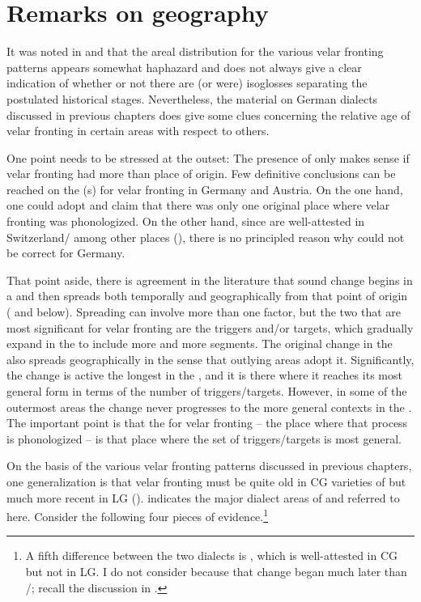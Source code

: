 \section{{Remarks} {on} {geography}}\label{sec:16.4}

It was noted in  and  that the areal distribution for the various velar fronting patterns appears somewhat haphazard and does not always give a clear indication of whether or not there are (or were) isoglosses separating the postulated historical stages. Nevertheless, the material on German dialects discussed in previous chapters does give some clues concerning the relative age of velar fronting in certain areas with respect to others.

One point needs to be stressed at the outset: The presence of  only makes sense if velar fronting had more than place of origin. Few definitive conclusions can be reached on the (s) for velar fronting in Germany and Austria. On the one hand, one could adopt  and claim that there was only one original place where velar fronting was phonologized. On the other hand, since  are well-attested in Switzerland/ among other places (), there is no principled reason why  could not be correct for Germany.

That point aside, there is agreement in the literature that  sound change begins in a  and then spreads both temporally and geographically from that point of origin ( and  below). Spreading can involve more than one factor, but the two that are most significant for velar fronting are the triggers and/or targets, which gradually expand in the  to include more and more segments. The original change in the  also spreads geographically in the sense that outlying areas adopt it. Significantly, the change is active the longest in the , and it is there where it reaches its most general form in terms of the number of triggers/targets. However, in some of the outermost areas the change never progresses to the more general contexts in the . The important point is that the  for velar fronting -- the place where that process is phonologized -- is that place where the set of triggers/targets is most general.\largerpage

On the basis of the various velar fronting patterns discussed in previous chapters, one generalization is that velar fronting must be quite old in CG varieties of  but much more recent in LG ().  indicates the major dialect areas of  and  referred to here. Consider the following four pieces of evidence.\footnote{{A fifth difference between the two dialects is , which is well-attested in CG but not in LG. I do not consider  because that change began much later than /; recall the discussion in .}}

